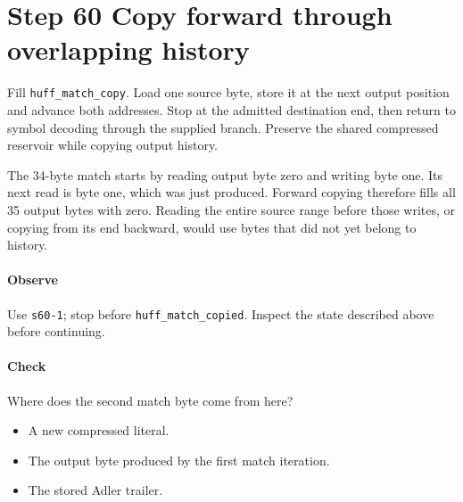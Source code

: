 \section{Step 60 Copy forward through overlapping history}\label{png-huff-s60}
Fill \texttt{huff\_match\_copy}. Load one source byte, store it at the next output position and advance both addresses. Stop at the admitted destination end, then return to symbol decoding through the supplied branch. Preserve the shared compressed reservoir while copying output history.

The 34-byte match starts by reading output byte zero and writing byte one. Its next read is byte one, which was just produced. Forward copying therefore fills all 35 output bytes with zero. Reading the entire source range before those writes, or copying from its end backward, would use bytes that did not yet belong to history.

\paragraph{Observe} Use \texttt{s60-1}; stop before \texttt{huff\_match\_copied}. Inspect the state described above before continuing.

\paragraph{Check} Where does the second match byte come from here?
\begin{itemize}
\item[A.] A new compressed literal.
\item[B.] The output byte produced by the first match iteration.
\item[C.] The stored Adler trailer.
\end{itemize}
